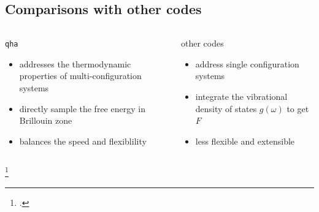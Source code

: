 \documentclass[13pt,aspectratio=169]{beamer}
\begin{document}
\subsection{Comparisons with other codes}
\begin{frame}{\subsecname}
	\begin{columns}
		\begin{column}{0.45\textwidth}
			\texttt{qha}\\
			\begin{itemize}[<+(1)->]
				\item addresses the thermodynamic properties of multi-configuration systems
				\item directly sample the free energy in Brillouin zone
				\item balances the speed and flexiblility
			\end{itemize}
		\end{column}

		\begin{column}{0.45\textwidth}
			other codes\\
			\begin{itemize}
				\item address single configuration systems
				\item integrate the vibrational density of states $g(\omega)$ to get $F$ \footnotemark
				\item less flexible and extensible \footnotemark
			\end{itemize}
		\end{column}
	\end{columns}
	\setcounter{footnote}{5}
	\footcitetext{Petretto:2018gg}
\end{frame}
\end{document}
